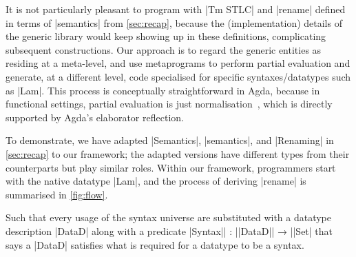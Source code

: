 \documentclass[sigplan,review,fleqn]{acmart}
\renewcommand{\verb}{\collectverb{\color{AgdaFunction}}}
\newcommand{\name}{\collectverb{\it}}
\begin{document}
It is not particularly pleasant to program with \verb|Tm STLC| and \verb|rename| defined in terms of \verb|semantics| from \cref{sec:recap}, because the (implementation) details of the generic library would keep showing up in these definitions, complicating subsequent constructions.
Our approach is to regard the generic entities as residing at a meta-level, and use metaprograms to perform partial evaluation and generate, at a different level, code specialised for specific syntaxes/datatypes such as \verb|Lam|.
This process is conceptually straightforward in Agda, because in functional settings, partial evaluation is just normalisation~\citep{Filinski-semantic-partial-evaluation}, which is directly supported by Agda's elaborator reflection.

To demonstrate, we have adapted \verb|Semantics|, \verb|semantics|, and \verb|Renaming| in \cref{sec:recap} to our framework; the adapted versions have different types from their counterparts but play similar roles.
Within our framework, programmers start with the native datatype \verb|Lam|, and the process of deriving \verb|rename| is summarised in \cref{fig:flow}.

\todo[inline]{}

Such that every usage of the syntax universe are substituted with a datatype description \verb|DataD| along with a predicate \verb|Syntax|\name| : |\verb|DataD|\name| → |\verb|Set| that says a \verb|DataD| satisfies what is required for a datatype to be a syntax.

\end{document}
